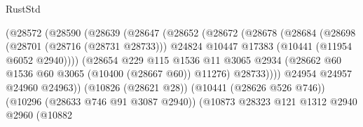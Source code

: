 \begin{lexlean}{RustStd}
\begin{coremodule}
                                        (@28572
                                          (@28590
                                            (@28639
                                              (@28647
                                                (@28652
                                                  (@28672
                                                    (@28678
                                                      (@28684
                                                        (@28698
                                                          (@28701 (@28716 (@28731 @28733)))
                                                          @24824
                                                          @10447
                                                          @17383
                                                          (@10441 (@11954 @6052 @2940))))
                                                      (@28654
                                                        @229
                                                        @115
                                                        @1536
                                                        @11
                                                        @3065
                                                        @2934
                                                        (@28662
                                                          @60
                                                          @1536
                                                          @60
                                                          @3065
                                                          (@10400 (@28667 @60))
                                                          @11276)
                                                        @28733))))
                                                @24954
                                                @24957
                                                @24960
                                                @24963))
                                            (@10826 (@28621 @28))
                                            (@10441 (@28626 @526 @746))
                                            (@10296 (@28633 @746 @91 @3087 @2940))
                                            (@10873
                                              @28323
                                              @121
                                              @1312
                                              @2940
                                              @2960
                                              (@10882

\end{coremodule}
\end{lexlean}
